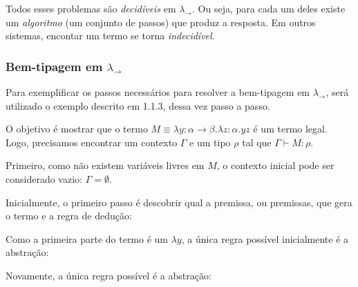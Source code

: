 \documentclass[../main.tex]{subfiles}
\begin{document}
Todos esses problemas são \emph{decidíveis} em $\lambda_\to$. Ou seja, para cada um deles existe um \emph{algoritmo} (um conjunto de passos) que produz a resposta. Em outros sistemas, encontar um termo se torna \emph{indecidível}.

\subsubsection[Bem-tipagem no STLC]{Bem-tipagem em $\lambda_\to$}

Para exemplificar os passos necessários para resolver a bem-tipagem em $\lambda_\to$, será utilizado o exemplo descrito em 1.1.3, dessa vez passo a passo.

O objetivo é mostrar que o termo $M \equiv \lambda y : \alpha \to \beta . \lambda z : \alpha . yz$ é um termo legal. Logo, precisamos encontrar um contexto $\Gamma$ e um tipo $\rho$ tal que $\Gamma \vdash M : \rho$.

Primeiro, como não existem variáveis livres em $M$, o contexto inicial pode ser considerado vazio: $\Gamma = \emptyset$.

Inicialmente, o primeiro passo é descobrir qual a premissa, ou premissas, que gera o termo e a regra de dedução:

\begin{prooftree}
\end{prooftree}

Como a primeira parte do termo é um $\lambda y$, a única regra possível inicialmente é a abstração:

\begin{prooftree}
\end{prooftree}

Novamente, a única regra possível é a abstração:


\begin{prooftree}
\end{prooftree}
\end{document}
